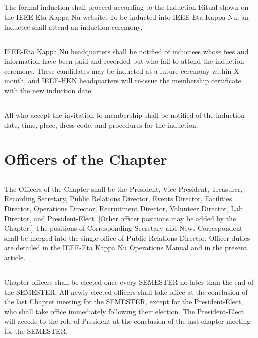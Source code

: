 \documentclass[10pt, oneside]{article}
\begin{document}
\subsection{}
The formal induction shall proceed according to the Induction Ritual shown on the IEEE-Eta Kappa Nu website. To be inducted into IEEE-Eta Kappa Nu, an inductee shall attend an induction ceremony.

\subsection{}
IEEE-Eta Kappa Nu headquarters shall be notified of inductees whose fees and information have been paid and recorded but who fail to attend the induction ceremony. These candidates may be inducted at a future ceremony within X month, and IEEE-HKN headquarters will re-issue the membership certificate with the new induction date.

\subsection{}
All who accept the invitation to membership shall be notified of the induction date, time, place, dress code, and procedures for the induction.


\section{Officers of the Chapter}
\subsection{} \label{Officers}
The Officers of the Chapter shall be the President, Vice-President, Treasurer, Recording Secretary, Public Relations Director, Events Director, Facilities Director, Operations Director, Recruitment Director, Volunteer Director, Lab Director, and President-Elect. [Other officer positions may be added by the Chapter.] The positions of Corresponding Secretary and News Correspondent shall be merged into the single office of Public Relations Director. Officer duties are detailed in the IEEE-Eta Kappa Nu Operations Manual and in the present article.

\subsection{}
Chapter officers shall be elected once every SEMESTER no later than the end of the SEMESTER. All newly elected officers shall take office at the conclusion of the last Chapter meeting for the SEMESTER, except for the President-Elect, who shall take office immediately following their election. The President-Elect will accede to the role of President at the conclusion of the last chapter meeting for the SEMESTER. 
\end{document}
